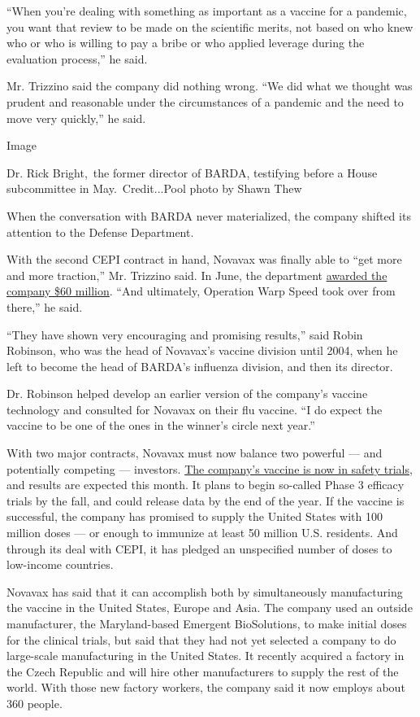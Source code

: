 ``When you're dealing with something as important as a vaccine for a
pandemic, you want that review to be made on the scientific merits, not
based on who knew who or who is willing to pay a bribe or who applied
leverage during the evaluation process,'' he said.

Mr. Trizzino said the company did nothing wrong. ``We did what we
thought was prudent and reasonable under the circumstances of a pandemic
and the need to move very quickly,'' he said.

Image

Dr. Rick Bright,~the former director of BARDA, testifying before a House
subcommittee in May.~Credit...Pool photo by Shawn Thew

When the conversation with BARDA never materialized, the company shifted
its attention to the Defense Department.

With the second CEPI contract in hand, Novavax was finally able to ``get
more and more traction,'' Mr. Trizzino said. In June, the department
\href{https://ir.novavax.com/news-releases/news-release-details/novavax-awarded-department-defense-contract-covid-19-vaccine}{awarded
the company \$60 million}. ``And ultimately, Operation Warp Speed took
over from there,'' he said.

``They have shown very encouraging and promising results,'' said Robin
Robinson, who was the head of Novavax's vaccine division until 2004,
when he left to become the head of BARDA's influenza division, and then
its director.

Dr. Robinson helped develop an earlier version of the company's vaccine
technology and consulted for Novavax on their flu vaccine. ``I do expect
the vaccine to be one of the ones in the winner's circle next year.''

With two major contracts, Novavax must now balance two powerful --- and
potentially competing --- investors.
\href{https://www.nytimes3xbfgragh.onion/interactive/2020/science/coronavirus-vaccine-tracker.html}{The
company's vaccine is now in safety trials}, and results are expected
this month. It plans to begin so-called Phase 3 efficacy trials by the
fall, and could release data by the end of the year. If the vaccine is
successful, the company has promised to supply the United States with
100 million doses --- or enough to immunize at least 50 million U.S.
residents. And through its deal with CEPI, it has pledged an unspecified
number of doses to low-income countries.

Novavax has said that it can accomplish both by simultaneously
manufacturing the vaccine in the United States, Europe and Asia. The
company used an outside manufacturer, the Maryland-based Emergent
BioSolutions, to make initial doses for the clinical trials, but said
that they had not yet selected a company to do large-scale manufacturing
in the United States. It recently acquired a factory in the Czech
Republic and will hire other manufacturers to supply the rest of the
world. With those new factory workers, the company said it now employs
about 360 people.

